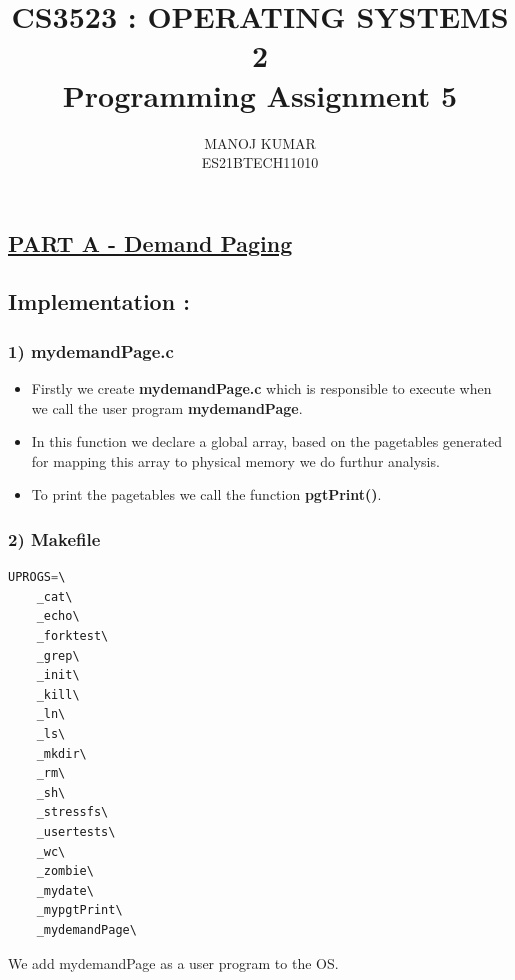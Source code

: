 \documentclass[12pt,a4paper]{article}
\title{CS3523 : OPERATING SYSTEMS 2 \\ Programming Assignment 5}
\author{MANOJ KUMAR \\ ES21BTECH11010 }
\date{}
\begin{document}
	\maketitle
	
	\newpage
	
	\subsection*{\underline{PART A - Demand Paging}}
	\subsection*{Implementation :}

	\subsubsection*{1) mydemandPage.c}
\begin{itemize}
	\item Firstly we create \textbf{mydemandPage.c} which is responsible to execute when we call the user program \textbf{mydemandPage}.
	\item In this function we declare a global array, based on the pagetables generated for mapping this array to physical memory we do furthur analysis.
	\item To print the pagetables we call the function \textbf{pgtPrint()}.
\end{itemize}
	\subsubsection*{2) Makefile}
									\begin{lstlisting}[language=C, style = mystyle]
	UPROGS=\
	_cat\
	_echo\
	_forktest\
	_grep\
	_init\
	_kill\
	_ln\
	_ls\
	_mkdir\
	_rm\
	_sh\
	_stressfs\
	_usertests\
	_wc\
	_zombie\
	_mydate\
	_mypgtPrint\
	_mydemandPage\
		\end{lstlisting}
	We add mydemandPage as a user program to the OS.
\end{document}

